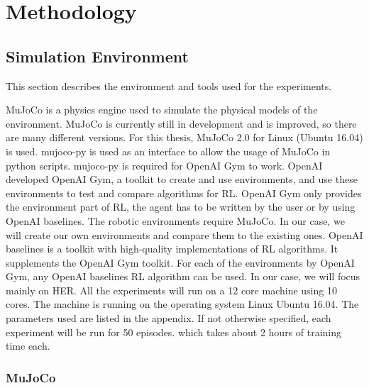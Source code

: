 \chapter{Methodology}


\section{Simulation Environment}

This section describes the environment and tools used for the experiments.

MuJoCo is a physics engine used to simulate the physical models of the environment. MuJoCo is currently still in development and is improved, so there are many different versions. For this thesis, MuJoCo 2.0 for Linux (Ubuntu 16.04) is used. 
\newline
mujoco-py is used as an interface to allow the usage of MuJoCo in python scripts. mujoco-py is required for OpenAI Gym to work.
\newline
OpenAI developed OpenAI Gym, a toolkit to create and use environments, and use these environments to test and compare algorithms for RL. OpenAI Gym only provides the environment part of RL, the agent has to be written by the user or by using OpenAI baselines. The robotic environments require MuJoCo. In our case, we will create our own environments and compare them to the existing ones.
\newline
OpenAI baselines is a toolkit with high-quality implementations of RL algorithms. It supplements the OpenAI Gym toolkit. For each of the environments by OpenAI Gym, any OpenAI baselines RL algorithm can be used. In our case, we will focus mainly on HER.
\newline
All the experiments will run on a 12 core machine using 10 cores. The machine is running on the operating system Linux Ubuntu 16.04. The parameters used are listed in the appendix. If not otherwise specified, each experiment will be run for 50 episodes. which takes about 2 hours of training time each.


\subsection{MuJoCo}

